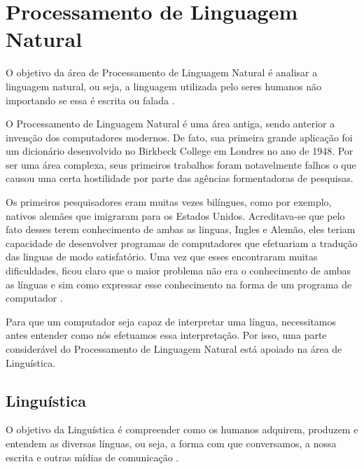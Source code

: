 \chapter{Processamento de Linguagem Natural}
\label{cap:Processamento}


O objetivo da área de Processamento de Linguagem Natural é analisar a linguagem natural, ou seja, a linguagem utilizada pelo seres humanos não
importando se essa é escrita ou falada \cite{manningschutze1999}.

O Processamento de Linguagem Natural é uma área antiga, sendo anterior a
invenção dos computadores modernos. De fato, sua primeira grande aplicação foi
um dicionário desenvolvido no Birkbeck College em Londres no ano de 1948. Por ser
uma área complexa, seus primeiros trabalhos foram notavelmente falhos o que
causou uma certa hostilidade por parte das agências formentadoras de pesquisas.

Os primeiros pesquisadores eram muitas vezes bilíngues, como por exemplo,
nativos alemães que imigraram para os Estados Unidos. Acreditava-se que pelo
fato desses terem conhecimento de ambas as linguas, Ingles e Alemão, eles teriam
capacidade de desenvolver programas de computadores que efetuariam a tradução das linguas
de modo satisfatório. Uma vez que esses encontraram muitas dificuldades,
ficou claro que o maior problema não era o conhecimento de ambas as
línguas e sim como expressar esse conhecimento na forma de um programa de
computador \cite{history}.

Para que um computador seja capaz de interpretar uma
língua, necessitamos antes entender como nós efetuamos essa
interpretação.
Por isso, uma parte considerável do Processamento de Linguagem Natural está apoiado na área de Linguística.

\section{Linguística}

O objetivo da Linguística é compreender como os humanos adquirem, produzem e
entendem as diversas línguas, ou seja, a forma com que conversamos, a nossa
escrita e outras mídias de comunicação \cite{manningschutze1999}.

